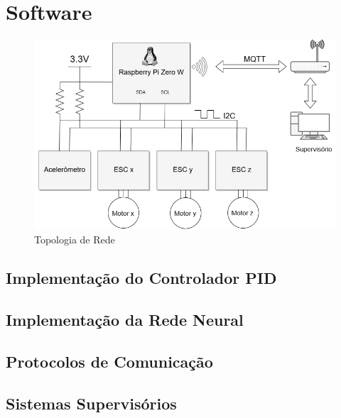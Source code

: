 \section{Software}

\begin{figure}[H]
  \caption{Topologia de Rede}
  \begin{center}
      \includegraphics[scale=.75]{img/comunicacao_projeto}
  \end{center}
  \label{fig:comunicacao_projeto}
\end{figure}

\subsection{Implementação do Controlador PID}

\subsection{Implementação da Rede Neural}

\subsection{Protocolos de Comunicação}

\subsection{Sistemas Supervisórios}
